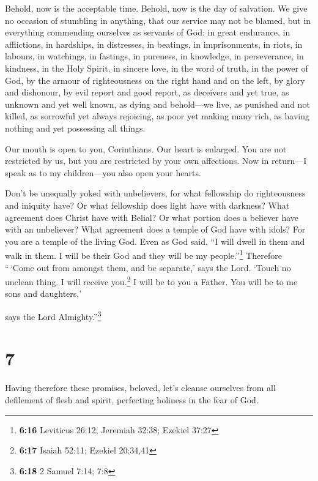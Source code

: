 Behold, now is the acceptable time. Behold, now is the day of salvation.
 We give no occasion of stumbling in anything, that our
service may not be blamed,  but in everything commending
ourselves as servants of God: in great endurance, in afflictions, in
hardships, in distresses,  in beatings, in imprisonments,
in riots, in labours, in watchings, in fastings,  in
pureness, in knowledge, in perseverance, in kindness, in the Holy
Spirit, in sincere love,  in the word of truth, in the
power of God, by the armour of righteousness on the right hand and on
the left,  by glory and dishonour, by evil report and good
report, as deceivers and yet true,  as unknown and yet
well known, as dying and behold---we live, as punished and not killed,
 as sorrowful yet always rejoicing, as poor yet making
many rich, as having nothing and yet possessing all things.

 Our mouth is open to you, Corinthians. Our heart is
enlarged.  You are not restricted by us, but you are
restricted by your own affections.  Now in return---I
speak as to my children---you also open your hearts.

 Don't be unequally yoked with unbelievers, for what
fellowship do righteousness and iniquity have? Or what fellowship does
light have with darkness?  What agreement does Christ
have with Belial? Or what portion does a believer have with an
unbeliever?  What agreement does a temple of God have
with idols? For you are a temple of the living God. Even as God said,
``I will dwell in them and walk in them. I will be their God and they
will be my people.''\footnote{\textbf{6:16} Leviticus 26:12; Jeremiah
  32:38; Ezekiel 37:27}  Therefore ``\,`Come out from
amongst them, and be separate,' says the Lord. `Touch no unclean thing.
I will receive you.\footnote{\textbf{6:17} Isaiah 52:11; Ezekiel
  20:34,41}  I will be to you a Father. You will be to me
sons and daughters,'

says the Lord Almighty.''\footnote{\textbf{6:18} 2 Samuel 7:14; 7:8}

\hypertarget{section-6}{%
\section{7}\label{section-6}}

 Having therefore these promises, beloved, let's cleanse
ourselves from all defilement of flesh and spirit, perfecting holiness
in the fear of God.

